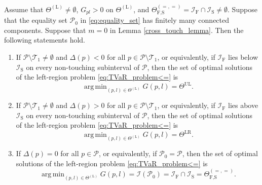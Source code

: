 \documentclass[a4paper,12pt]{article}
\DeclareMathOperator*{\argmin}{arg\,min}
\begin{document}
\begin{proposition}\label{prop:tvar_third_result}
Assume that $\Theta^{\left(\text{L}\right)}\neq\emptyset$, $G_{pl}>0$ on $\Theta^{\left(\text{L}\right)}$, and $\Theta_{\text{F,S}}^{\left(=,=\right)}=\mathcal{I}_{\text{F}}\cap\mathcal{I}_{\text{S}}\neq\emptyset$. Suppose that the equality set $\mathcal{P}_0$ in \eqref{eq:equality_set} has finitely many connected components. Suppose that $m=0$ in Lemma \ref{cross_touch_lemma}. Then the following statements hold.

\begin{enumerate}
\item[(i)] If $\mathcal{P}\setminus\mathcal{T}_1\neq\emptyset$ and $\Delta\left(p\right)<0$ for all $p\in\mathcal{P}\setminus\mathcal{T}_1$, or equivalently, if $\mathcal{I}_{\text{F}}$ lies below $\mathcal{I}_{\text{S}}$ on every non-touching subinterval of $\mathcal{P}$, then the set of optimal solutions of the left-region problem \eqref{eq:TVaR_problem<=} is
\begin{equation}
\argmin_{\left(p,l\right)\in\Theta^{\left(\text{L}\right)}}G\left(p,l\right)=\Theta^{\text{UL}}.
\label{prop:tvar_third_result_result1}
\end{equation}
\item[(ii)] If $\mathcal{P}\setminus\mathcal{T}_1\neq\emptyset$ and $\Delta\left(p\right)>0$ for all $p\in\mathcal{P}\setminus\mathcal{T}_1$, or equivalently, if $\mathcal{I}_{\text{F}}$ lies above $\mathcal{I}_{\text{S}}$ on every non-touching subinterval of $\mathcal{P}$, then the set of optimal solutions of the left-region problem \eqref{eq:TVaR_problem<=} is
\begin{equation}
\argmin_{\left(p,l\right)\in\Theta^{\left(\text{L}\right)}}G\left(p,l\right)=\Theta^{\text{LR}}.
\label{prop:tvar_third_result_result2}
\end{equation}
\item[(iii)] If $\Delta\left(p\right)=0$ for all $p\in\mathcal{P}$, or equivalently, if $\mathcal{P}_0=\mathcal{P}$, then the set of optimal solutions of the left-region problem \eqref{eq:TVaR_problem<=} is
\begin{equation}
\argmin_{\left(p,l\right)\in\Theta^{\left(\text{L}\right)}}G\left(p,l\right)=\mathcal{I}\left(\mathcal{P}_0\right)=\mathcal{I}_{\text{F}}\cap\mathcal{I}_{\text{S}}=\Theta_{\text{F,S}}^{\left(=,=\right)}.
\label{prop:tvar_third_result_result3}
\end{equation}
\end{enumerate}
\end{proposition}
\end{document}
